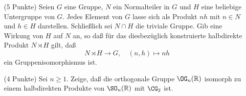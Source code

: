 \documentclass{algsheet}
\begin{document}
\begin{exercise}(5 Punkte)\newline
    Seien \(G\) eine Gruppe, \(N\) ein Normalteiler in \(G\) und \(H\) eine
    beliebige Untergruppe von \(G\). Jedes Element von \(G\) lasse sich als
    Produkt \(n h\) mit \(n \in N\) und \(h \in H\) darstellen. Schließlich
    sei \(N \cap H\) die triviale Gruppe. Gib eine Wirkung von \(H\) auf
    \(N\) an, so daß für das diesbezüglich konstruierte halbdirekte Produkt
    \(N \rtimes H\) gilt, daß
    \begin{equation}
        N \rtimes H \to G,\quad (n, h) \mapsto n h
    \end{equation}
    ein Gruppenisomorphismus ist.
\end{exercise}

\begin{exercise}(4 Punkte)\newline
    Sei \(n \ge 1\). Zeige, daß die orthogonale Gruppe \(\OG_n(\mathbb R)\) isomorph
    zu einem halbdirekten Produkte von \(\SO_n(\mathbb R)\) mit \(\CG_2\) ist.
\end{exercise}
\end{document}
